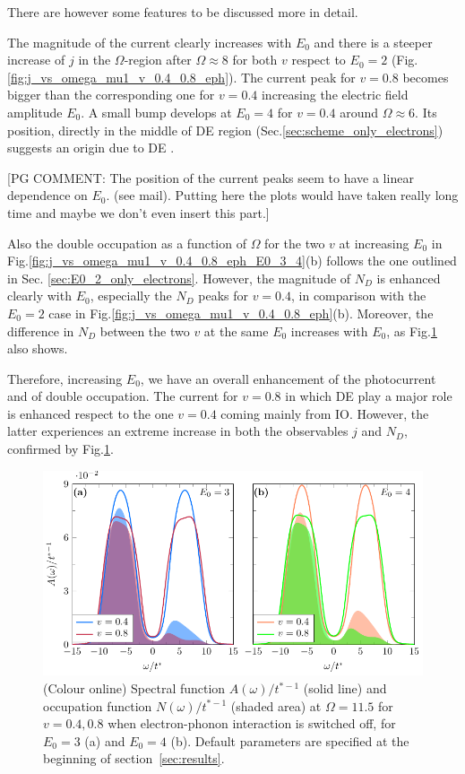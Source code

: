 \documentclass[aps,prb,groupedaddress,showpacs,twocolumn,superscriptaddress,10pt]{revtex4-2}
\newcommand{\pgcomm}[1]{{\color{ao(english)} [PG COMMENT: #1]}}
\begin{document}
There are however some features to be discussed more in detail.

The magnitude of the current clearly increases with $E_0$ and there is a steeper increase of $j$ in the $\Omega$-region after $\Omega\approx8$ for both $v$ respect to $E_0=2$ (Fig.\ref{fig:j_vs_omega_mu1_v_0.4_0.8_eph}). The current peak for $v=0.8$ becomes bigger than the corresponding one for $v=0.4$ increasing the electric field amplitude $E_0$. A small bump develops at $E_0=4$ for $v=0.4$ around $\Omega\approx6$. Its position, directly in the middle of DE region (Sec.\ref{sec:scheme_only_electrons}) suggests an origin due to DE \cite{so.do.18}.  

\pgcomm{The position of the current peaks seem to have a linear dependence on $E_0$. (see mail). Putting here the plots would have taken really long time and maybe we don't even insert this part.}  

Also the double occupation as a function of $\Omega$ for the two $v$ at increasing $E_0$ in Fig.\ref{fig:j_vs_omega_mu1_v_0.4_0.8_eph_E0_3_4}(b) follows the one outlined in Sec. \ref{sec:E0_2_only_electrons}. However, the magnitude of $N_D$ is enhanced clearly with $E_0$, especially the $N_D$ peaks for $v=0.4$, in comparison with the $E_0=2$ case in Fig.\ref{fig:j_vs_omega_mu1_v_0.4_0.8_eph}(b). Moreover, the difference in $N_D$ between the two $v$ at the same $E_0$ increases with $E_0$, as Fig.\ref{fig:spec_filling_mu1_v_0.4_0.8_E3_4_O_11.5_e} also shows. 

Therefore, increasing $E_0$, we have an overall enhancement of the photocurrent and of double occupation. The current for $v=0.8$ in which DE play a major role is enhanced respect to the one $v=0.4$ coming mainly from IO. However, the latter experiences an extreme increase in both the observables $j$ and $N_D$, confirmed by Fig.\ref{fig:spec_filling_mu1_v_0.4_0.8_E3_4_O_11.5_e}. 


\begin{figure}[ht]
\includegraphics[width=\linewidth]{./figures_Paper1/spec_filling_mu1_v_0.4_0.8_E3_4_O_11.5_e.pdf}
\caption{(Colour online) Spectral function $A(\omega)/t^{* -1}$ (solid line) and occupation function $N(\omega)/t^{* -1}$ (shaded area) at $\Omega=11.5$ for $v=0.4,0.8$ when electron-phonon interaction is switched off, for $E_0=3$ (a) and $E_0=4$ (b). Default parameters are specified at the beginning of section~\ref{sec:results}.} 
\label{fig:spec_filling_mu1_v_0.4_0.8_E3_4_O_11.5_e}
\end{figure} 
\end{document}
